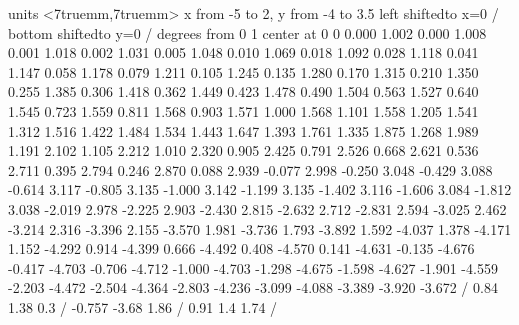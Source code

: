 \begin{exercises}
\figure
\vbox{\beginpicture
\normalgraphs
\sevenpoint
\setcoordinatesystem units <7truemm,7truemm>
\setplotarea x from -5 to 2, y from -4  to 3.5
\axis left shiftedto x=0 /
\axis bottom shiftedto y=0 /
 degrees from 0 1 center at 0 0
\setquadratic
\textRed
{} 0.000 1.002 0.000 1.008 0.001 1.018 0.002 1.031 0.005
1.048 0.010 1.069 0.018 1.092 0.028 1.118 0.041 1.147 0.058
1.178 0.079 1.211 0.105 1.245 0.135 1.280 0.170 1.315 0.210
1.350 0.255 1.385 0.306 1.418 0.362 1.449 0.423 1.478 0.490
1.504 0.563 1.527 0.640 1.545 0.723 1.559 0.811 1.568 0.903
1.571 1.000 1.568 1.101 1.558 1.205 1.541 1.312 1.516 1.422
1.484 1.534 1.443 1.647 1.393 1.761 1.335 1.875 1.268 1.989
1.191 2.102 1.105 2.212 1.010 2.320 0.905 2.425 0.791 2.526
0.668 2.621 0.536 2.711 0.395 2.794 0.246 2.870 0.088 2.939
-0.077 2.998 -0.250 3.048 -0.429 3.088 -0.614 3.117 -0.805 3.135
-1.000 3.142 -1.199 3.135 -1.402 3.116 -1.606 3.084 -1.812 3.038
-2.019 2.978 -2.225 2.903 -2.430 2.815 -2.632 2.712 -2.831 2.594
-3.025 2.462 -3.214 2.316 -3.396 2.155 -3.570 1.981 -3.736 1.793
-3.892 1.592 -4.037 1.378 -4.171 1.152 -4.292 0.914 -4.399 0.666
-4.492 0.408 -4.570 0.141 -4.631 -0.135 -4.676 -0.417 -4.703 -0.706
-4.712 -1.000 -4.703 -1.298 -4.675 -1.598 -4.627 -1.901 -4.559 -2.203
-4.472 -2.504 -4.364 -2.803 -4.236 -3.099 -4.088 -3.389 -3.920 -3.672 /
\textBlack
\setlinear\setdashes <2pt>
 0.84 1.38 0.3 /
 -0.757 -3.68 1.86 /
 0.91 1.4 1.74 /
\endpicture}

\end{exercises}
